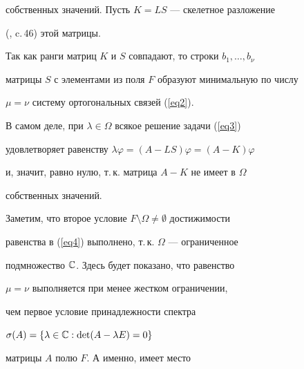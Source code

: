 собственных значений. Пусть $K = LS$ --- скелетное разложение 


(\cite{b4}, c.\,46) этой матрицы.


Так как ранги матриц $K$ и $S$ совпадают, то строки $b_1,\dotsc,b_\nu$


матрицы $S$ с элементами из поля $F$ образуют минимальную по числу


$\mu =\nu$ систему ортогональных связей (\ref{eq2}).


В самом деле, при $\lambda\in\Omega$ всякое решение задачи (\ref{eq3})


удовлетворяет равенству $\lambda\varphi = (A - LS)\varphi = (A - K)\varphi$


и, значит, равно нулю, т.\,к. матрица $A - K$ не имеет в $\Omega$


собственных значений.





Заметим, что второе условие $F\setminus\Omega\ne\emptyset$ достижимости


равенства в (\ref{eq4}) выполнено, т.\,к. $\Omega$ --- ограниченное 


подмножество $\Bbb C$. Здесь будет показано, что равенство 


$\mu = \nu$ выполняется при менее жестком ограничении, 


чем первое условие принадлежности спектра 


$\sigma(A) = \{\lambda\in \Bbb C : \det(A-\lambda E) = 0\}$


матрицы $A$ полю $F$. А именно, имеет место








